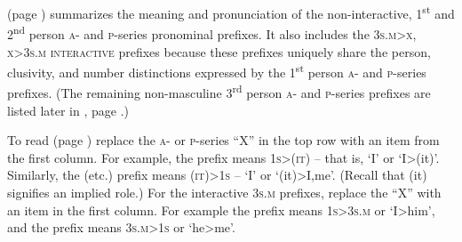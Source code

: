 \FloatBarrier
{} (page \pageref{figtab:a,o,3s.m interactions}) summarizes the meaning and pronunciation of the non-interactive, 1\textsuperscript{st} and 2\textsuperscript{nd} person \textsc{a}- and \textsc{p}-series pronominal prefixes. It also includes the \textsc{3s.m>x}, \textsc{x>3s.m} \textsc{interactive} prefixes because these prefixes uniquely share the person, clusivity, and number distinctions expressed by the 1\textsuperscript{st} person \textsc{a}- and \textsc{p}-series prefixes. (The remaining non-masculine 3\textsuperscript{rd} person \textsc{a}- and \textsc{p}-series prefixes are listed later in , page \pageref{figtab:3:3 interactions}.)

To read  (page \pageref{figtab:a,o,3s.m interactions}) replace the \textsc{a}- or \textsc{p}-series “X” in the top row with an item from the first column. For example, the  prefix means \textsc{1s>(it)} -- that is, ‘I’ or ‘I>(it)’. Similarly, the  (etc.) prefix means \textsc{(it)>1s} -- ‘I’ or ‘(it)>I,me’. (Recall that (it) signifies an implied role.) For the interactive \textsc{3s.m} prefixes, replace the “X” with an item in the first column. For example the  prefix means \textsc{1s>3s.m} or ‘I>him’, and the  prefix means \textsc{3s.m>1s} or ‘he>me’.

